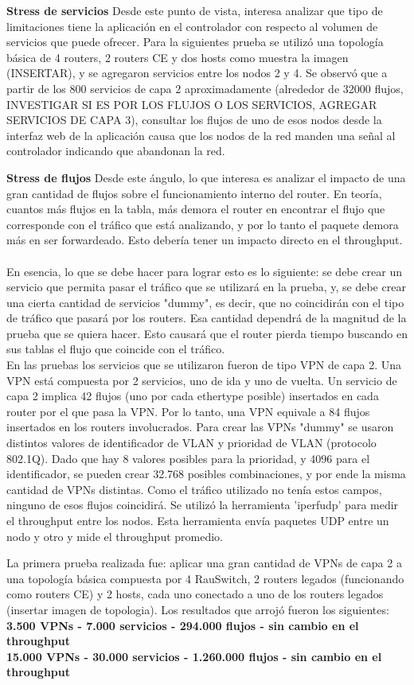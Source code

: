 \documentclass[a4paper,12pt]{report}
\begin{document}
\textbf{Stress de servicios}
Desde este punto de vista, interesa analizar que tipo de limitaciones tiene la aplicación en el controlador con respecto al volumen de servicios que puede ofrecer.
Para la siguientes prueba se utilizó una topología básica de 4 routers, 2 routers CE y dos hosts como muestra la imagen (INSERTAR), y se agregaron servicios entre los nodos 2 y 4. Se observó que a partir de los 800 servicios de capa 2 aproximadamente (alrededor de 32000 flujos, INVESTIGAR SI ES POR LOS FLUJOS O LOS SERVICIOS, AGREGAR SERVICIOS DE CAPA 3), consultar los flujos de uno de esos nodos desde la interfaz web de la aplicación causa que los nodos de la red manden una señal al controlador indicando que abandonan la red.

\textbf{Stress de flujos}
Desde este ángulo, lo que interesa es analizar el impacto de una gran cantidad de flujos sobre el funcionamiento interno del router. En teoría, cuantos más flujos en la tabla, más demora el router en encontrar el flujo que corresponde con el tráfico que está analizando, y por lo tanto el paquete demora más en ser forwardeado. Esto debería tener un impacto directo en el throughput.\\
\\
En esencia, lo que se debe hacer para lograr esto es lo siguiente: se debe crear un servicio que permita pasar el tráfico que se utilizará en la prueba, y, se debe crear una cierta cantidad de servicios "dummy", es decir, que no coincidirán con el tipo de tráfico que pasará por los routers. Esa cantidad dependrá de la magnitud de la prueba que se quiera hacer. Esto causará que el router pierda tiempo buscando en sus tablas el flujo que coincide con el tráfico.\\

En las pruebas los servicios que se utilizaron fueron de tipo VPN de capa 2. Una VPN está compuesta por 2 servicios, uno de ida y uno de vuelta. Un servicio de capa 2 implica 42 flujos (uno por cada ethertype posible) insertados en cada router por el que pasa la VPN. Por lo tanto, una VPN equivale a 84 flujos insertados en los routers involucrados.
Para crear las VPNs "dummy" se usaron distintos valores de identificador de VLAN y prioridad de VLAN (protocolo 802.1Q). Dado que hay 8 valores posibles para la prioridad, y 4096 para el identificador, se pueden crear 32.768 posibles combinaciones, y por ende la misma cantidad de VPNs distintas. Como el tráfico utilizado no tenía estos campos, ninguno de esos flujos coincidirá.
Se utilizó la herramienta 'iperfudp' para medir el throughput entre los nodos. Esta herramienta envía paquetes UDP entre un nodo y otro y mide el throughput promedio.


La primera prueba realizada fue: aplicar una gran cantidad de VPNs de capa 2 a una topología básica compuesta por 4 RauSwitch, 2 routers legados (funcionando como routers CE) y 2 hosts, cada uno conectado a uno de los routers legados (insertar imagen de topologia).
Los resultados que arrojó fueron los siguientes:\\
\textbf{3.500 VPNs - 7.000 servicios - 294.000 flujos - sin cambio en el throughput}\\
\textbf{15.000 VPNs - 30.000 servicios - 1.260.000 flujos - sin cambio en el throughput}
\end{document}
